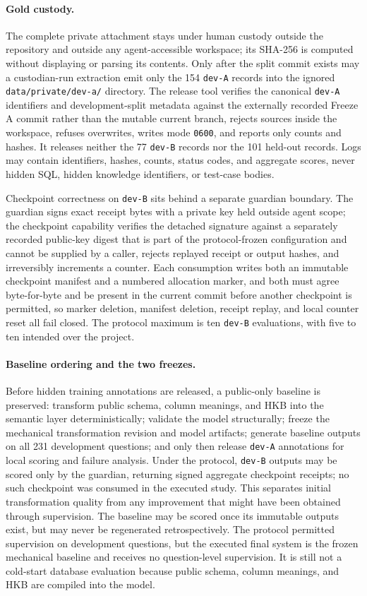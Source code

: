 \paragraph{Gold custody.}
The complete private attachment stays under human custody outside the repository
and outside any agent-accessible workspace; its SHA-256 is computed without
displaying or parsing its contents. Only after the split commit exists may a
custodian-run extraction emit only the 154 \texttt{dev-A} records into the
ignored \texttt{data/private/dev-a/} directory. The release tool verifies the
canonical \texttt{dev-A} identifiers and development-split metadata against the
externally recorded Freeze A commit rather than the mutable current branch,
rejects sources inside the workspace, refuses overwrites, writes mode
\texttt{0600}, and reports only counts and hashes. It releases neither the 77
\texttt{dev-B} records nor the 101 held-out records. Logs may contain identifiers, hashes, counts, status codes, and
aggregate scores, never hidden SQL, hidden knowledge identifiers, or test-case
bodies.

Checkpoint correctness on \texttt{dev-B} sits behind a separate guardian
boundary. The guardian signs exact receipt bytes with a private key held outside
agent scope; the checkpoint capability verifies the detached signature against a
separately recorded public-key digest that is part of the protocol-frozen
configuration and cannot be supplied by a caller, rejects replayed receipt or
output hashes, and irreversibly increments a counter. Each consumption writes
both an immutable checkpoint manifest and a numbered allocation marker, and both
must agree byte-for-byte and be present in the current commit before another
checkpoint is permitted, so marker deletion, manifest deletion, receipt replay,
and local counter reset all fail closed. The protocol maximum is ten
\texttt{dev-B} evaluations, with five to ten intended over the project.

\paragraph{Baseline ordering and the two freezes.}
Before hidden training annotations are released, a public-only baseline is
preserved: transform public schema, column meanings, and HKB into the semantic
layer deterministically; validate the model structurally; freeze the mechanical
transformation revision and model artifacts; generate baseline outputs on all 231
development questions; and only then release \texttt{dev-A} annotations for
local scoring and failure analysis. Under the protocol, \texttt{dev-B} outputs may be scored only
by the guardian, returning signed aggregate checkpoint receipts; no such
checkpoint was consumed in the executed study. This separates initial
transformation quality from any improvement that might have been obtained through supervision. The baseline may be scored once its immutable
outputs exist, but may never be regenerated retrospectively. The protocol
permitted supervision on development questions, but the executed final system is
the frozen mechanical baseline and receives no question-level supervision. It is
still not a cold-start database evaluation because public schema, column
meanings, and HKB are compiled into the model.

